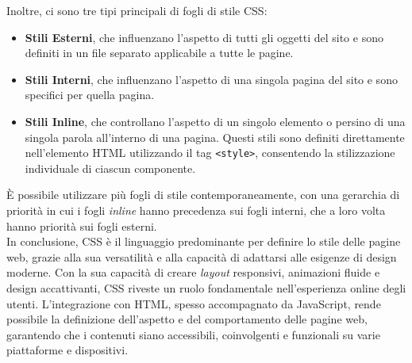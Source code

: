 Inoltre, ci sono tre tipi principali di fogli di stile CSS:
\begin{itemize}
    \item \textbf{Stili Esterni}, che influenzano l'aspetto di tutti gli oggetti del sito e sono definiti in un file separato applicabile a tutte le pagine.\cite{CSS_infobasic}
    \item \textbf{Stili Interni}, che influenzano l'aspetto di una singola pagina del sito e sono specifici per quella pagina.\cite{CSS_infobasic}
    \item \textbf{Stili Inline}, che controllano l'aspetto di un singolo elemento o persino di una singola parola all'interno di una pagina. Questi stili sono definiti direttamente nell'elemento HTML utilizzando il tag \texttt{<style>}, consentendo la stilizzazione individuale di ciascun componente.\cite{CSS_creativemotions}\cite{CSS_infobasic}
\end{itemize}
È possibile utilizzare più fogli di stile contemporaneamente, con una gerarchia di priorità in cui i fogli \textit{inline} hanno precedenza sui fogli interni, che a loro volta hanno priorità sui fogli esterni.\cite{CSS_dmep}\\
In conclusione, CSS è il linguaggio predominante per definire lo stile delle pagine web, grazie alla sua versatilità e alla capacità di adattarsi alle esigenze di design moderne. Con la sua capacità di creare \textit{layout} responsivi, animazioni fluide e design accattivanti, CSS riveste un ruolo fondamentale nell'esperienza online degli utenti. L’integrazione con HTML, spesso accompagnato da JavaScript, rende possibile la definizione dell'aspetto e del comportamento delle pagine web, garantendo che i contenuti siano accessibili, coinvolgenti e funzionali su varie piattaforme e dispositivi.
